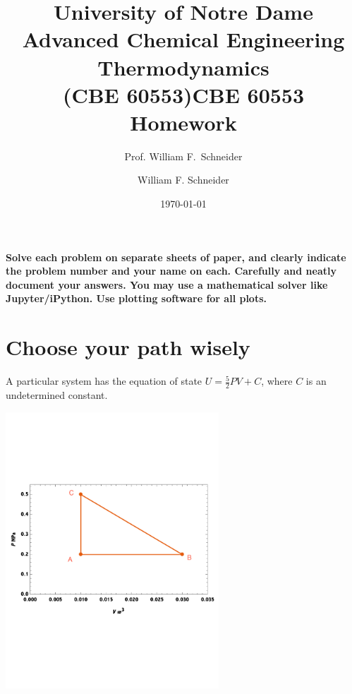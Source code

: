 \documentclass[11pt]{article}
\title{University of Notre Dame\\Advanced Chemical Engineering Thermodynamics\\(CBE 60553)}
\author{Prof. William F.\ Schneider}
\author{William F. Schneider}
\date{\today}
\title{CBE 60553 Homework}
\begin{document}
\begin{OPTIONS}
\end{OPTIONS}

\noindent \textbf{Solve each problem on separate sheets of paper, and clearly indicate the problem number and your name on each.  Carefully and neatly document your answers.  You may use a mathematical solver like Jupyter/iPython. Use plotting software for all plots.}

\section{Choose your path wisely}
\label{sec:orgcbddafb}
A particular system has the equation of state \(U = \frac{5}{2} PV + C\), where \(C\) is an undetermined constant.

\begin{center}
\begin{center}
\includegraphics[width=0.6\textwidth]{./Figure1-annotated.pdf}
\end{center}
\end{center}
\end{document}
